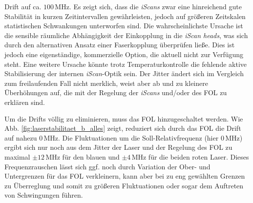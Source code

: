 Drift auf ca. $100\,$MHz. Es zeigt sich, dass die \textit{iScans} zwar
eine hinreichend gute Stabilität in kurzen Zeitintervallen gewährleisten, jedoch
auf größeren Zeitskalen statistischen Schwankungen unterworfen sind. Die
wahrscheinlichste Ursache ist die sensible räumliche Abhängigkeit der
Einkopplung in die \textit{iScan heads}, was sich durch den alternativen Ansatz
einer Faserkopplung überprüfen ließe. Dies ist jedoch eine eigenständige,
kommerzielle Option, die aktuell nicht zur Verfügung steht. Eine weitere Ursache
könnte trotz Temperaturkontrolle die fehlende aktive Stabilisierung der internen \textit{iScan}-Optik sein. Der Jitter ändert sich im Vergleich zum freilaufenden Fall nicht merklich,
weist aber ab und zu kleinere Überhöhungen auf, die mit der Regelung der
\textit{iScans} und/oder des FOL zu erklären sind.\par
Um die Drifts völlig zu eliminieren, muss das FOL hinzugeschaltet werden. Wie
Abb. \ref{fig:laserstabilitaet_b_alles} zeigt, reduziert sich
durch das FOL die Drift auf nahezu $0\,$MHz. Die Fluktuationen um die
Soll-Relativfrequenz (hier $0\,$MHz) ergibt sich nur noch aus dem Jitter der
Laser und der Regelung des FOL zu maximal $\pm12\,$MHz für den blauen und
$\pm4\,$MHz für die beiden roten Laser. Dieses Frequenzrauschen lässt sich ggf.
noch durch Variation der Ober- und Untergrenzen für das FOL verkleinern, kann
aber bei zu eng gewählten Grenzen zu Überreglung und somit zu größeren
Fluktuationen oder sogar dem Auftreten von Schwingungen führen.
